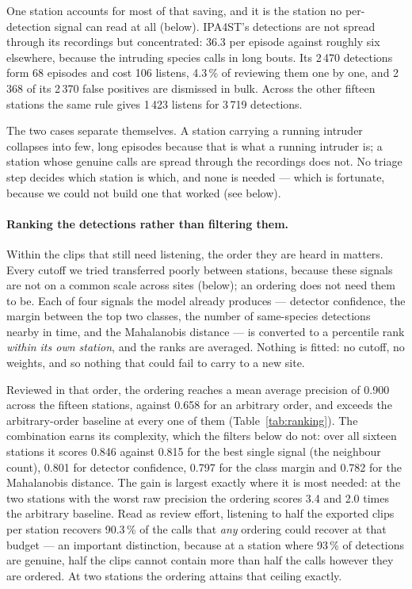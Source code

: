 \documentclass[final,3p,times]{elsarticle}
\begin{document}
One station accounts for most of that saving, and it is the station no
per-detection signal can read at all (below). IPA4ST's detections are not
spread through its recordings but concentrated: 36.3 per
episode against roughly six elsewhere, because the intruding species calls in
long bouts. Its 2\,470 detections form 68 episodes and cost 106 listens, 4.3\,\%
of reviewing them one by one, and 2\,368 of its 2\,370 false positives are
dismissed in bulk. Across the other fifteen stations the same rule gives 1\,423
listens for 3\,719 detections.

The two cases separate themselves. A station carrying a running intruder
collapses into few, long episodes because that is what a running intruder is; a
station whose genuine calls are spread through the recordings does not. No
triage step decides which station is which, and none is needed --- which is
fortunate, because we could not build one that worked (see below).

\paragraph{Ranking the detections rather than filtering them.}
Within the clips that still need listening, the order they are heard in
matters. Every cutoff we tried transferred poorly between stations, because
these signals are not on a common scale across sites (below); an ordering does
not need them to be. Each of four signals the model already produces --- detector confidence,
the margin between the top two classes, the number of same-species detections
nearby in time, and the Mahalanobis distance --- is converted to a percentile
rank \emph{within its own station}, and the ranks are averaged. Nothing is
fitted: no cutoff, no weights, and so nothing that could fail to carry to a new
site.

Reviewed in that order, the ordering reaches a mean average precision of 0.900
across the fifteen stations, against 0.658 for an arbitrary order, and exceeds
the arbitrary-order baseline at every one of them (Table~\ref{tab:ranking}).
The combination earns its complexity, which the filters below do not: over all
sixteen stations it scores 0.846 against 0.815 for the best single signal (the
neighbour count), 0.801 for detector confidence, 0.797 for the class margin and
0.782 for the Mahalanobis distance.
The gain is largest exactly where it is most needed: at the two stations with
the worst raw precision the ordering scores 3.4 and 2.0 times the arbitrary
baseline. Read as review effort, listening to half the exported clips per
station recovers 90.3\,\% of the calls that \emph{any} ordering could recover
at that budget --- an important distinction, because at a station where 93\,\%
of detections are genuine, half the clips cannot contain more than half the
calls however they are ordered. At two stations the ordering attains that
ceiling exactly.
\end{document}
